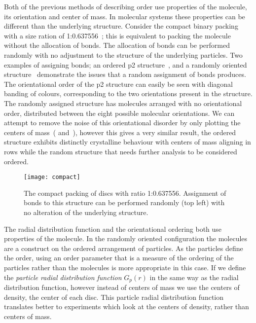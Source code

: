 Both of the previous methods of describing order use properties of the molecule, its orientation and center of mass. In molecular systems these properties can be different than the underlying structure. Consider the compact binary packing with a size ration of 1:0.637556~; this is equivalent to packing the \scon molecule without the allocation of bonds. The allocation of bonds can be performed randomly with no adjustment to the structure of the underlying particles. Two examples of assigning bonds; an ordered p2 structure~, and a randomly oriented structure~ demonstrate the issues that a random assignment of bonds produces. The orientational order of the p2 structure can easily be seen with diagonal banding of colours, corresponding to the two orientations present in the structure. The randomly assigned structure has molecules arranged with no orientational order, distributed between the eight possible molecular orientations. We can attempt to remove the noise of this orientational disorder by only plotting the centers of mass~( and~), however this gives a very similar result, the ordered structure exhibits distinctly crystalline behaviour with centers of mass aligning in rows while the random structure that needs further analysis to be considered ordered.

\begin{figure}
    \centering
    \texttt{[image: compact]}
    \caption{The compact packing of discs with ratio 1:0.637556. Assignment of bonds to this structure can be performed randomly (top left) with no alteration of the underlying structure.}
    \label{fig:compact}
\end{figure}

The radial distribution function and the orientational ordering both use properties of the molecule. In the randomly oriented configuration the molecules are a construct on the ordered arrangement of particles. As the particles define the order, using an order parameter that is a measure of the ordering of the particles rather than the molecules is more appropriate in this case. If we define the \emph{particle radial distribution function} $G_p(r)$ in the same way as the radial distribution function, however instead of centers of mass we use the centers of density, the center of each disc. This particle radial distribution function translates better to experiments which look at the centers of density, rather than centers of mass. 



